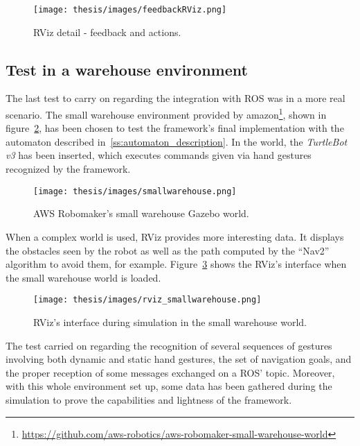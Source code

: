 \documentclass[../thesis.tex]{subfiles}
\begin{document}
\begin{figure}[H]
    \centering
    \texttt{[image: thesis/images/feedbackRViz.png]}
    \caption{RViz detail - feedback and actions.}
    \label{fig:rviz_feedback}
\end{figure}

\subsection{Test in a warehouse environment}

The last test to carry on regarding the integration with \gls{ROS} was in a more real scenario. The small warehouse environment provided by amazon\footnote{\href{https://github.com/aws-robotics/aws-robomaker-small-warehouse-world}{https://github.com/aws-robotics/aws-robomaker-small-warehouse-world}}, shown in figure~\ref{fig:small_warehouse_gazebo_world}, has been chosen to test the framework's final implementation with the automaton described in~\ref{ss:automaton_description}. In the world, the \textit{TurtleBot v3} has been inserted, which executes commands given via hand gestures recognized by the framework.

\begin{figure}[H]
    \centering
    \texttt{[image: thesis/images/smallwarehouse.png]}
    \caption{AWS Robomaker's small warehouse Gazebo world.}
    \label{fig:small_warehouse_gazebo_world}
\end{figure}

When a complex world is used, RViz provides more interesting data. It displays the obstacles seen by the robot as well as the path computed by the ``Nav2'' algorithm to avoid them, for example. Figure~\ref{fig:rviz_smallwarehouse} shows the RViz's interface when the small warehouse world is loaded.

\begin{figure}[H]
    \centering
    \texttt{[image: thesis/images/rviz\_smallwarehouse.png]}
    \caption{RViz's interface during simulation in the small warehouse world.}
    \label{fig:rviz_smallwarehouse}
\end{figure}


The test carried on regarding the recognition of several sequences of gestures involving both dynamic and static hand gestures, the set of navigation goals, and the proper reception of some messages exchanged on a \gls{ROS}' topic. Moreover, with this whole environment set up, some data has been gathered during the simulation to prove the capabilities and lightness of the framework.
\end{document}

